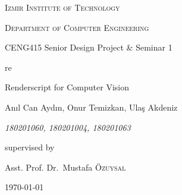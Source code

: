 \documentclass[12pt, a4paper]{article} \pagenumbering{gobble}
\begin{document}
  \begin{titlepage}
    \centering
    {\scshape\Large Izmir Institute of Technology\par}
    {\scshape\large Department of Computer Engineering\par}
    {CENG415 Senior Design Project & Seminar 1\par}
    \vspace{2.5cm}
	  {\huge re\par}
	  \vspace{1cm}
	  {\Large Renderscript for Computer Vision\par}
	\vspace{2cm}
	{\Large An{\i}l Can Ayd{\i}n, Onur Temizkan, Ula\c{s} Akdeniz\par}
  {\itshape180201060, 180201004, 180201063\par}
	\vfill
	supervised by\par
	\large{Asst. Prof. Dr.~Mustafa \textsc{\"{O}zuysal}}

	\vfill

	{\large \today\par}
  \end{titlepage}
  \newpage
  \tableofcontents
\end{document}
